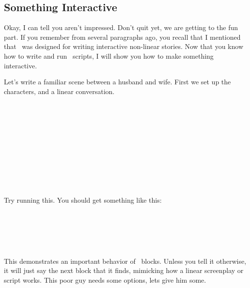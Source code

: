 \subsection{Something Interactive}

Okay, I can tell you aren't impressed. Don't quit yet, we are getting to the fun part.  If you remember from several paragraphs ago, you recall that I mentioned that \SSquared\ was designed for writing interactive non-linear stories.  Now that you know how to write and run \SSquared\ scripts, I will show you how to make something interactive.

Let's write a familiar scene between a husband and wife.  First we set up the characters, and a linear conversation.

\begin{SSCodeBox}
 \\
 \\
\scitea{} \\
\scitea{\{} \\
\scitea{\hspace*{4em}}
\scitea{;} \\
\scitea{\}} \\
\scitea{} \\
\scitea{\{} \\
\scitea{\hspace*{4em}}
\scitea{;} \\
\scitea{\}}
\end{SSCodeBox}
Try running this.  You should get something like this:

\begin{SSCodeBox}
 \\
 \\
\scitea{} \\
 \\
\end{SSCodeBox}

This demonstrates an important behavior of \SSquared\ blocks. Unless you tell it otherwise, it will just say the next block that it finds, mimicking how a linear screenplay or script works.  This poor guy needs some options, lets give him some.


